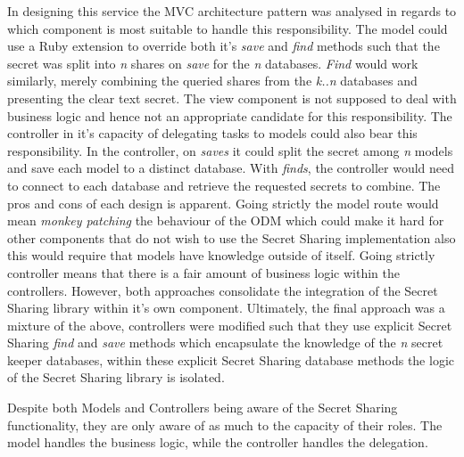 In designing this service the MVC architecture pattern was analysed in regards to which component is most suitable to handle this responsibility. The model could use a Ruby extension to override both it's \textit{save} and \textit{find} methods such that the secret was split into \textit{n} shares on \textit{save} for the \textit{n} databases. \textit{Find} would work similarly, merely combining the queried shares from the \textit{k..n} databases and presenting the clear text secret. The view component is not supposed to deal with business logic and hence not an appropriate candidate for this responsibility. The controller in it's capacity of delegating tasks to models could also bear this responsibility. In the controller, on \textit{saves} it could split the secret among \textit{n} models and save each model to a distinct database. With \textit{finds}, the controller would need to connect to each database and retrieve the requested secrets to combine. The pros and cons of each design is apparent. Going strictly the model route would mean \textit{monkey patching} \cite{Monke1:online} the behaviour of the ODM which could make it hard for other components that do not wish to use the Secret Sharing implementation also this would require that models have knowledge outside of itself. Going strictly controller means that there is a fair amount of business logic within the controllers. However, both approaches consolidate the integration of the Secret Sharing library within it's own component. Ultimately, the final approach was a mixture of the above, controllers were modified such that they use explicit Secret Sharing \textit{find} and \textit{save} methods which encapsulate the knowledge of the \textit{n} secret keeper databases, within these explicit Secret Sharing database methods the logic of the Secret Sharing library is isolated.
\par
Despite both Models and Controllers being aware of the Secret Sharing functionality, they are only aware of as much to the capacity of their roles. The model handles the business logic, while the controller handles the delegation.

